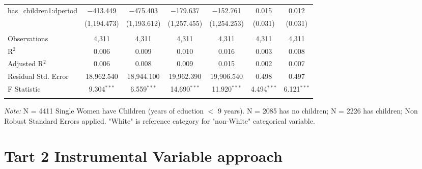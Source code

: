 \documentclass[a4paper]{article}
\begin{document}
\begin{table}[!htbp]
\begin{adjustwidth}{0.cm}{-0cm}
\begin{threeparttable}
\begin{tabular}{@{\extracolsep{-2pt}}lcccccc}
  has\_children1:dperiod & $-$413.449 & $-$475.403 & $-$179.637 & $-$152.761 & 0.015 & 0.012 \\ 
  & (1,194.473) & (1,193.612) & (1,257.455) & (1,254.253) & (0.031) & (0.031) \\ 
 \hline \\[-1.8ex] 
Observations & 4,311 & 4,311 & 4,311 & 4,311 & 4,311 & 4,311 \\ 
R$^{2}$ & 0.006 & 0.009 & 0.010 & 0.016 & 0.003 & 0.008 \\ 
Adjusted R$^{2}$ & 0.006 & 0.008 & 0.009 & 0.015 & 0.002 & 0.007 \\ 
Residual Std. Error & 18,962.540 & 18,944.100  & 19,962.390  & 19,906.540 & 0.498 & 0.497  \\ 
F Statistic & 9.304$^{***}$  & 6.559$^{***}$ & 14.690$^{***}$  & 11.920$^{***}$ & 4.494$^{***}$  & 6.121$^{***}$  \\ 
\hline 
\hline \\[-3.5ex] 
\end{tabular} 
\begin{tablenotes}
      \small
      \item\textit{Note:} N = 4411 Single Women have Children (years of eduction $<$ 9 years). N = 2085 has no children; N = 2226 has children; Non Robust Standard Errors applied. "White" is reference category for "non-White" categorical variable.
    \end{tablenotes}
\end{threeparttable}
\end{adjustwidth}
%
\end{table}




\pagebreak

\section{Tart 2 Instrumental Variable approach}
\end{document}
